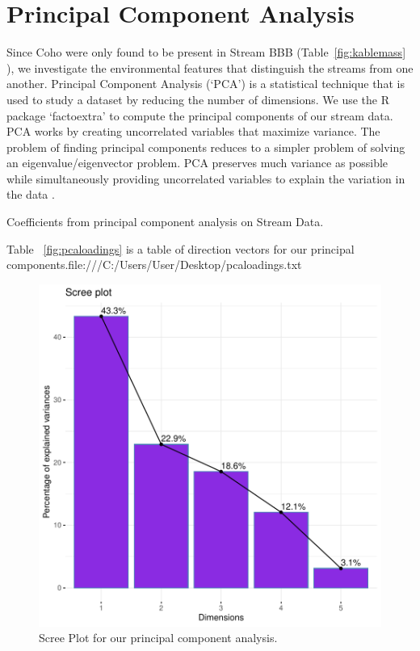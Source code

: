 \section{Principal Component Analysis}



Since Coho were only found to be present in Stream BBB (Table~\ref{fig:kablemass} ), we investigate the environmental features that distinguish the streams from one another. Principal Component Analysis (`PCA') is a statistical technique that is used to study a dataset by reducing the number of dimensions. We use the R package `factoextra' \citep{facto} to compute the principal components of our stream data. PCA works by creating uncorrelated variables that maximize variance. The problem of finding principal components reduces to a simpler problem of solving an eigenvalue/eigenvector problem. PCA preserves much variance as possible while simultaneously providing uncorrelated variables to explain the variation in the data \citep{PCA}.

\vspace{5mm}

\begin{table}[H]
\begin{singlespace*}

\end{singlespace*}
\caption{Coefficients from principal component analysis on Stream Data.}
\label{fig:pcaloadings}
\end{table}

Table ~\ref{fig:pcaloadings} is a table of direction vectors for our principal components.file:///C:/Users/User/Desktop/pcaloadings.txt

\begin{figure}[H]
\includegraphics{Chapter5Images/scree.pdf}
\caption{Scree Plot for our principal component analysis.}
\label{fig:scree}
\end{figure}

